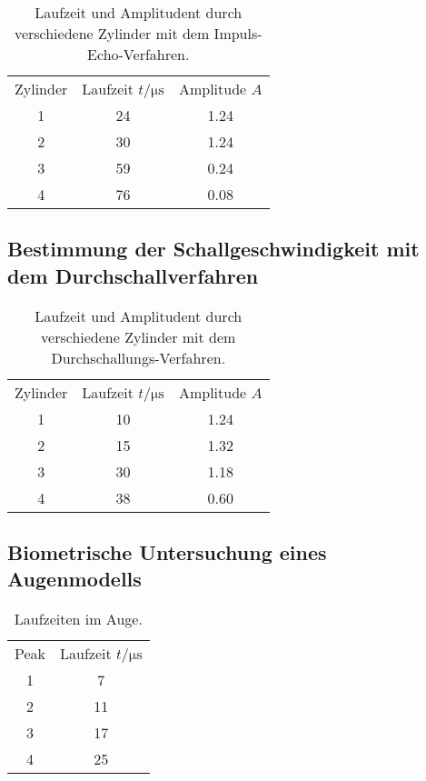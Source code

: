 \begin{table}[H]
  \centering
  \caption{Laufzeit und Amplitudent durch verschiedene Zylinder mit dem Impuls-Echo-Verfahren.}
  \label{tab:tAimpE}
  \begin{tabular}{S[table-format=1.0] S[table-format=2.0] S[table-format=1.2] }
  \toprule
  {Zylinder} & {Laufzeit $t / \si{\micro\second}$} &  {Amplitude $A$}\\
  1 &  24  & 1.24  \\
  2 &  30  & 1.24  \\
  3 &  59  & 0.24  \\
  4 &  76  & 0.08  \\
  \bottomrule
  \end{tabular}
\end{table}

\subsection{Bestimmung der Schallgeschwindigkeit mit dem Durchschallverfahren}
\label{subsec:SchallDurchV}

\begin{table}[H]
  \centering
  \caption{Laufzeit und Amplitudent durch verschiedene Zylinder mit dem Durchschallungs-Verfahren.}
  \label{tab:tADurch}
  \begin{tabular}{S[table-format=1.0] S[table-format=2.0] S[table-format=1.2] }
  \toprule
  {Zylinder} & {Laufzeit $t / \si{\micro\second}$} &  {Amplitude $A$}\\
  1 &  10  & 1.24  \\
  2 &  15  & 1.32  \\
  3 &  30  & 1.18  \\
  4 &  38  & 0.60  \\
  \bottomrule
  \end{tabular}
\end{table}

\subsection{Biometrische Untersuchung eines Augenmodells}
\label{subsec:Auge}

\begin{table}[H]
  \centering
  \caption{Laufzeiten im Auge.}
  \label{tab:Auge}
  \begin{tabular}{S[table-format=1.0] S[table-format=2.0] }
  \toprule
  {Peak} & {Laufzeit $t / \si{\micro\second}$} \\
  1 &  7 \\
  2 &  11 \\
  3 &  17 \\
  4 &  25 \\
  \bottomrule
  \end{tabular}
\end{table}